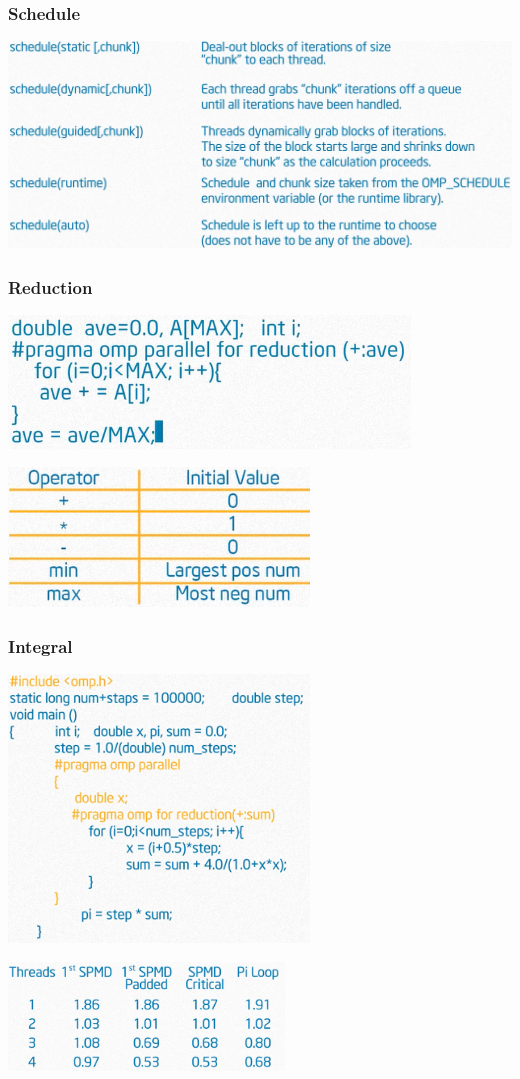 \documentclass{beamer}
\begin{document}
\begin{frame}
  \frametitle{Schedule}
  \includegraphics[width=\textwidth]{schedule}  
\end{frame}


\begin{frame}
  \frametitle{Reduction}
  \centering
  \includegraphics[width=0.8\textwidth]{reduction} \pause
  
  \includegraphics[width=0.6\textwidth]{reduction-init}    
\end{frame}


\begin{frame}[plain]
  \frametitle{Integral}
  \centering
  \includegraphics[width=0.6\textwidth]{integral-worksharing}\pause

  \includegraphics[width=0.55\textwidth]{integral-worksharing-time}
\end{frame}
\end{document}
